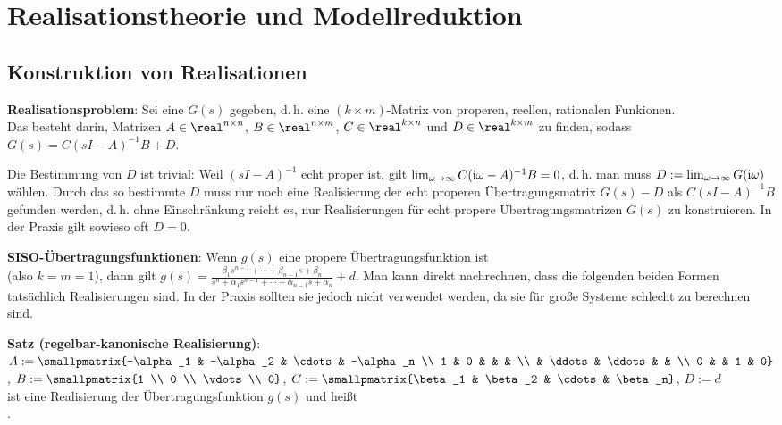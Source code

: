 \chapter{%
    Realisationstheorie und Modellreduktion%
}

\section{%
    Konstruktion von Realisationen%
}

\textbf{Realisationsproblem}:
Sei eine  $G(s)$ gegeben, d.\,h.
eine $(k \times m)$-Matrix von properen, reellen, rationalen Funkionen.\\
Das  besteht darin, Matrizen
$A \in \real^{n \times n}$, $B \in \real^{n \times m}$, $C \in \real^{k \times n}$ und
$D \in \real^{k \times m}$ zu finden, sodass $G(s) = C(sI - A)^{-1} B + D$.

Die Bestimmung von $D$ ist trivial:
Weil $(sI - A)^{-1}$ echt proper ist, gilt
$\lim_{\omega \to \infty} C(\text{i}\omega - A)^{-1} B = 0$, d.\,h. man muss
$D := \lim_{\omega \to \infty} G(\text{i}\omega)$ wählen.
Durch das so bestimmte $D$ muss nur noch eine Realisierung der echt properen Übertragungsmatrix
$G(s) - D$ als $C(sI - A)^{-1} B$ gefunden werden, d.\,h. ohne Einschränkung reicht es,
nur Realisierungen für echt propere Übertragungsmatrizen $G(s)$ zu konstruieren.
In der Praxis gilt sowieso oft $D = 0$.

\linie

\textbf{SISO-Übertragungsfunktionen}:
Wenn $g(s)$ eine propere Übertragungsfunktion ist\\
(also $k = m = 1$), dann gilt
$g(s) = \frac{\beta_1 s^{n-1} + \dotsb + \beta_{n-1} s + \beta_n}
{s^n + \alpha_1 s^{n-1} + \dotsb + \alpha_{n-1} s + \alpha_n} + d$.
Man kann direkt nachrechnen, dass die folgenden beiden Formen tatsächlich Realisierungen sind.
In der Praxis sollten sie jedoch nicht verwendet werden, da sie für große Systeme schlecht zu
berechnen sind.

\textbf{Satz (regelbar-kanonische Realisierung)}:\\
$A := \smallpmatrix{-\alpha_1 & -\alpha_2 & \cdots & -\alpha_n \\
1 & 0 & & & \\ & \ddots & \ddots & & \\ 0 & & 1 & 0}$,
$B := \smallpmatrix{1 \\ 0 \\ \vdots \\ 0}$,
$C := \smallpmatrix{\beta_1 & \beta_2 & \cdots & \beta_n}$,
$D := d$\\
ist eine Realisierung der Übertragungsfunktion $g(s)$ und heißt\\
.

